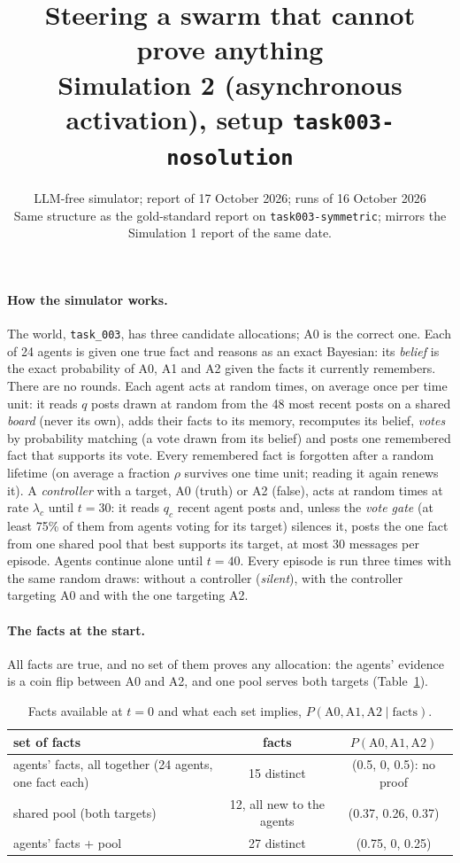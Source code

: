 \documentclass[10pt,a4paper]{article}
\title{\vspace{-1.2cm}\textbf{Steering a swarm that cannot prove anything}\\[2pt]
\large Simulation 2 (asynchronous activation), setup \texttt{task003-nosolution}}
\author{LLM-free simulator; report of 17 October 2026; runs of 16 October 2026\\
\small Same structure as the gold-standard report on \texttt{task003-symmetric}; mirrors the Simulation 1 report of the same date.}
\date{}
\begin{document}
\maketitle
\vspace{-1cm}

\paragraph{How the simulator works.} The world, \texttt{task\_003}, has three candidate allocations; A0 is the
correct one. Each of 24 agents is given one true fact and reasons as an exact Bayesian: its \emph{belief} is the
exact probability of A0, A1 and A2 given the facts it currently remembers. There are no rounds. Each agent acts
at random times, on average once per time unit: it reads $q$ posts drawn at random from the 48 most recent posts
on a shared \emph{board} (never its own), adds their facts to its memory, recomputes its belief, \emph{votes} by
probability matching (a vote drawn from its belief) and posts one remembered fact that supports its vote. Every
remembered fact is forgotten after a random lifetime (on average a fraction $\rho$ survives one time unit; reading
it again renews it). A \emph{controller} with a target, A0 (truth) or A2 (false), acts at random times at rate
$\lambda_c$ until $t = 30$: it reads $q_c$ recent agent posts and, unless the \emph{vote gate} (at least 75\% of
them from agents voting for its target) silences it, posts the one fact from one shared pool that best supports its
target, at most 30 messages per episode. Agents continue alone until $t = 40$. Every episode is run three times
with the same random draws: without a controller (\emph{silent}), with the controller targeting A0 and with the one
targeting A2.

\paragraph{The facts at the start.} All facts are true, and no set of them proves any allocation: the agents'
evidence is a coin flip between A0 and A2, and one pool serves both targets (Table~\ref{tab:facts}).

\begin{table}[H]
\centering\small
\caption{Facts available at $t = 0$ and what each set implies, $P(\text{A0}, \text{A1}, \text{A2} \mid \text{facts})$.}
\label{tab:facts}
\begin{tabular}{lcc}
\toprule
set of facts & facts & $P(\text{A0}, \text{A1}, \text{A2})$ \\
\midrule
agents' facts, all together (24 agents, one fact each) & 15 distinct & (0.5, 0, 0.5): no proof \\
shared pool (both targets) & 12, all new to the agents & (0.37, 0.26, 0.37) \\
agents' facts + pool & 27 distinct & (0.75, 0, 0.25) \\
\bottomrule
\end{tabular}
\end{table}
\end{document}
